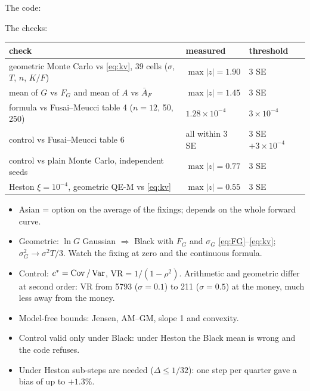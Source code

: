 \begin{progetto}[title={In the qpricer project: code and results}]
The code:

\medskip

\noindent The checks:
\begin{center}
\small
\begin{tabularx}{\textwidth}{>{\raggedright\arraybackslash}Xll}
\toprule
check & measured & threshold\\
\midrule
geometric Monte Carlo vs \eqref{eq:kv}, 39 cells ($\sigma$, $T$, $n$, $K/F$) & $\max|z|=1.90$ & 3 SE\\
mean of $G$ vs $F_G$ and mean of $A$ vs $\bar A_F$ & $\max|z|=1.45$ & 3 SE\\
formula vs Fusai--Meucci table 4 ($n=12$, 50, 250) & $1.28\times10^{-4}$ & $3\times10^{-4}$\\
control vs Fusai--Meucci table 6 & all within 3 SE & 3 SE $+3\times10^{-4}$\\
control vs plain Monte Carlo, independent seeds & $\max|z|=0.77$ & 3 SE\\
Heston $\xi=10^{-4}$, geometric QE-M vs \eqref{eq:kv} & $\max|z|=0.55$ & 3 SE\\
\bottomrule
\end{tabularx}
\end{center}
\end{progetto}

\begin{riassunto}
\begin{itemize}
\item Asian = option on the average of the fixings; depends on the whole forward curve.
\item Geometric: $\ln G$ Gaussian $\Rightarrow$ Black with $F_G$ and $\sigma_G$ \eqref{eq:FG}--\eqref{eq:kv};
$\sigma_G^2\to\sigma^2T/3$. Watch the fixing at zero and the continuous formula.
\item Control: $c^*=\operatorname{Cov}/\operatorname{Var}$, $\mathrm{VR}=1/(1-\rho^2)$. Arithmetic and geometric differ at second order: VR from
5793 ($\sigma=0.1$) to 211 ($\sigma=0.5$) at the money, much less away from the money.
\item Model-free bounds: Jensen, AM--GM, slope 1 and convexity.
\item Control valid only under Black: under Heston the Black mean is wrong and the code refuses.
\item Under Heston sub-steps are needed ($\Delta\le1/32$): one step per quarter gave a bias of up to $+1.3\%$.
\end{itemize}
\end{riassunto}

